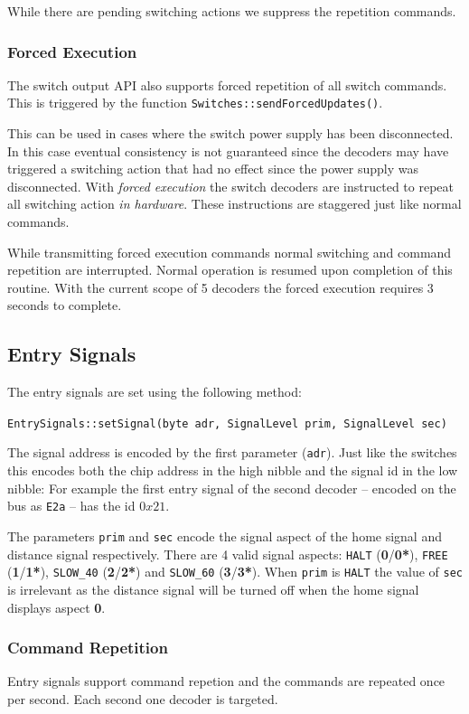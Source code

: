\documentclass{scrreprt}
\newcommand{\code}[1]{\texttt{#1}}
\begin{document}
While there are pending switching actions we suppress the repetition commands.

\subsubsection{Forced Execution}
The switch output API also supports forced repetition of all switch commands.
This is triggered by the function \code{Switches::sendForcedUpdates()}.

This can be used in cases where the switch power supply has been disconnected.
In this case eventual consistency is not guaranteed since the decoders may have triggered a switching action that had no effect since the power supply was disconnected.
With \emph{forced execution} the switch decoders are instructed to repeat all switching action \emph{in hardware}.
These instructions are staggered just like normal commands.

While transmitting forced execution commands normal switching and command repetition are interrupted.
Normal operation is resumed upon completion of this routine.
With the current scope of 5 decoders the forced execution requires 3 seconds to complete.

\subsection{Entry Signals}
The entry signals are set using the following method:

\code{EntrySignals::setSignal(byte adr, SignalLevel prim, SignalLevel sec)}

The signal address is encoded by the first parameter (\code{adr}).
Just like the switches this encodes both the chip address in the high nibble and the signal id in the low nibble:
For example the first entry signal of the second decoder -- encoded on the bus as \code{E2a} -- has the id $0x21$.

The parameters \code{prim} and \code{sec} encode the signal aspect of the home signal and distance signal respectively.
There are 4 valid signal aspects:
\code{HALT} (\textbf{0}/\textbf{0*}), \code{FREE} (\textbf{1}/\textbf{1*}), \code{SLOW\_40} (\textbf{2}/\textbf{2*}) and \code{SLOW\_60} (\textbf{3}/\textbf{3*}).
When \code{prim} is \code{HALT} the value of \code{sec} is irrelevant as the distance signal will be turned off when the home signal displays aspect \textbf{0}.

\subsubsection{Command Repetition}
Entry signals support command repetion and the commands are repeated once per second.
Each second one decoder is targeted.
\end{document}
